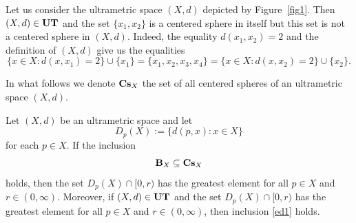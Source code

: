\documentclass{article}
\begin{document}
\begin{Example}
Let us consider the ultrametric space $(X,d)$ depicted by Figure~\ref{fig1}. Then $(X,d)\in {\bf UT}$ and the set $\{x_1,x_2\}$ is a centered sphere in itself
but this set is not a centered sphere in $(X,d)$.  
Indeed, the equality $d(x_1,x_2)=2$ and the definition of $(X,d)$ give us the equalities
\begin{equation*}
\{x\in X \colon d(x,x_1)=2\}\cup\{x_1\}
= \{x_1,x_2,x_3,x_4\}
= \{x\in X \colon d(x,x_2)=2\}\cup\{x_2\}.
\end{equation*}
\end{Example}








In what follows we denote  ${\bf Cs}_X$  the set of all centered spheres of an ultrametric space $(X,d)$.


\begin{Theorem}\label{efhik}
Let $(X,d)$ be an ultrametric space and let 
\begin{equation}
    \label{fesdi6-1}
D_p(X) := \{ d(p,x) : x \in X \}
\end{equation}
for each $p\in X$.
If the inclusion 
\begin{equation}
    \label{ed1}
{\bf B}_X \subseteq {\bf Cs}_X
\end{equation}
holds, then the set
$D_p(X)\cap [0,r)$ has the greatest element for all $p\in X$ and $r\in (0,\infty)$. Moreover, if $(X,d)\in {\bf UT}$ and the set $D_p(X)\cap [0,r)$ has the greatest element for all $p\in X$ and $r\in (0,\infty)$, then inclusion \eqref{ed1} holds.
\end{Theorem}
\end{document}

